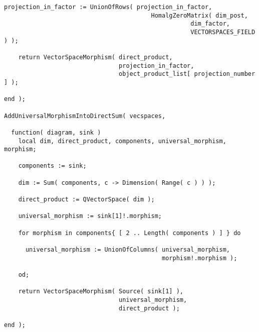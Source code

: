\begin{small}
\begin{Verbatim}[frame=single]
    projection_in_factor := UnionOfRows( projection_in_factor, 
                                         HomalgZeroMatrix( dim_post,
                                                    dim_factor,
                                                    VECTORSPACES_FIELD ) );
    
    return VectorSpaceMorphism( direct_product,
                                projection_in_factor,
                                object_product_list[ projection_number ] );

end );

AddUniversalMorphismIntoDirectSum( vecspaces,

  function( diagram, sink )
    local dim, direct_product, components, universal_morphism, morphism;
    
    components := sink;
    
    dim := Sum( components, c -> Dimension( Range( c ) ) );
    
    direct_product := QVectorSpace( dim );
    
    universal_morphism := sink[1]!.morphism;
    
    for morphism in components{ [ 2 .. Length( components ) ] } do
    
      universal_morphism := UnionOfColumns( universal_morphism,
                                            morphism!.morphism );
  
    od;
  
    return VectorSpaceMorphism( Source( sink[1] ),
                                universal_morphism,
                                direct_product );
  
end );
\end{Verbatim}
\end{small}